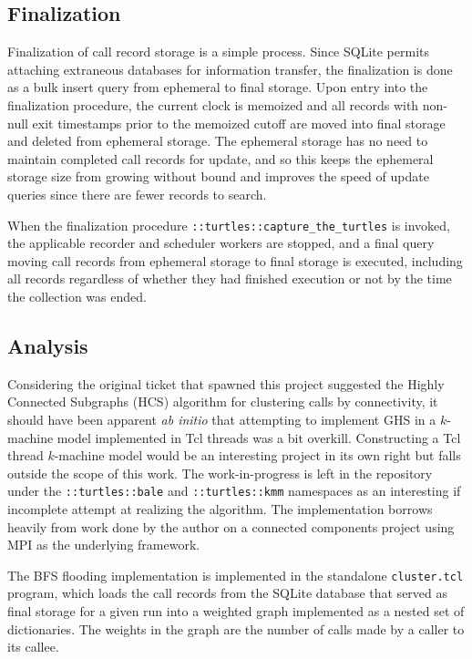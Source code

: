 \documentclass{article}[letter,10pt]
\begin{document}
{  \subsection{Finalization}{
    Finalization of call record storage is a simple process. Since SQLite permits attaching extraneous databases
    for information transfer, the finalization is done as a bulk insert query from ephemeral to final storage.
    Upon entry into the finalization procedure, the current clock is memoized and all records with non-null exit
    timestamps prior to the memoized cutoff are moved into final storage and deleted from ephemeral storage.
    The ephemeral storage has no need to maintain completed call records for update, and so this keeps the ephemeral
    storage size from growing without bound and improves the speed of update queries since there are fewer records
    to search.

    When the finalization procedure \texttt{::turtles::capture\_the\_turtles} is invoked,
    the applicable recorder and scheduler workers are stopped, and a final query moving call records
    from ephemeral storage to final storage is executed, including all records regardless of whether they had
    finished execution or not by the time the collection was ended.
  }

  \subsection{Analysis}{
    Considering the original ticket that spawned this project suggested the Highly Connected Subgraphs (HCS) algorithm\autocite{HCS}
    for clustering calls by connectivity, it should have been apparent \emph{ab initio} that attempting to implement
    GHS in a $k$-machine model implemented in Tcl threads was a bit overkill. Constructing a Tcl thread $k$-machine
    model would be an interesting project in its own right but falls outside the scope of this work. The work-in-progress
    is left in the repository under the \texttt{::turtles::bale} and \texttt{::turtles::kmm} namespaces as an
    interesting if incomplete attempt at realizing the algorithm. The implementation borrows heavily from work
    done by the author\autocite{ghscoco} on a connected components project using MPI\autocites{mpi}{openmpi} as the underlying framework.

    The BFS flooding implementation is implemented in the standalone \texttt{cluster.tcl} program, which loads
    the call records from the SQLite database that served as final storage for a given run into a weighted graph
    implemented as a nested set of dictionaries. The weights in the graph are the number of calls made by a caller
    to its callee.

}}
\end{document}
